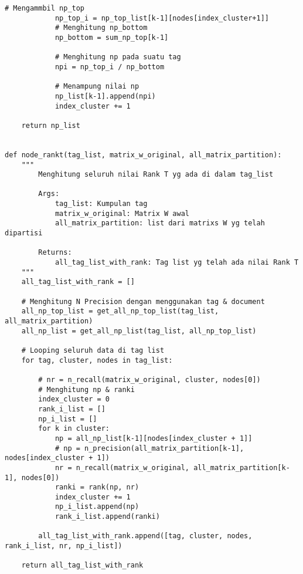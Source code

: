 \begin{lstlisting}[breaklines=true]
			# Mengammbil np_top
			np_top_i = np_top_list[k-1][nodes[index_cluster+1]]
			# Menghitung np_bottom
			np_bottom = sum_np_top[k-1]
			
			# Menghitung np pada suatu tag
			npi = np_top_i / np_bottom
			
			# Menampung nilai np
			np_list[k-1].append(npi)
			index_cluster += 1
		
	return np_list


def node_rankt(tag_list, matrix_w_original, all_matrix_partition):
	"""
		Menghitung seluruh nilai Rank T yg ada di dalam tag_list

		Args:
			tag_list: Kumpulan tag
			matrix_w_original: Matrix W awal
			all_matrix_partition: list dari matrixs W yg telah dipartisi

		Returns:
			all_tag_list_with_rank: Tag list yg telah ada nilai Rank T
	"""
	all_tag_list_with_rank = []
	
	# Menghitung N Precision dengan menggunakan tag & document
	all_np_top_list = get_all_np_top_list(tag_list, all_matrix_partition)
	all_np_list = get_all_np_list(tag_list, all_np_top_list)
	
	# Looping seluruh data di tag list
	for tag, cluster, nodes in tag_list:
		
		# nr = n_recall(matrix_w_original, cluster, nodes[0])
		# Menghitung np & ranki
		index_cluster = 0
		rank_i_list = []
		np_i_list = []
		for k in cluster:
			np = all_np_list[k-1][nodes[index_cluster + 1]]
			# np = n_precision(all_matrix_partition[k-1], nodes[index_cluster + 1])
			nr = n_recall(matrix_w_original, all_matrix_partition[k-1], nodes[0])
			ranki = rank(np, nr)
			index_cluster += 1
			np_i_list.append(np)
			rank_i_list.append(ranki)
		
		all_tag_list_with_rank.append([tag, cluster, nodes, rank_i_list, nr, np_i_list])
	
	return all_tag_list_with_rank

	
\end{lstlisting}

